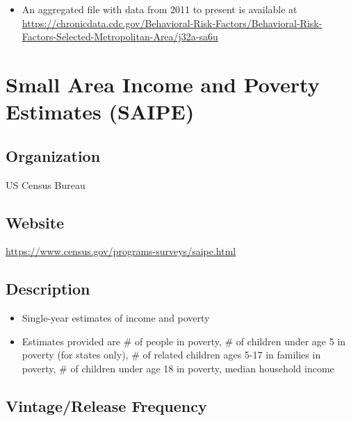 \documentclass[
]{book}
\providecommand{\tightlist}{%
  \setlength{\itemsep}{0pt}\setlength{\parskip}{0pt}}
\begin{document}
\begin{itemize}
\tightlist
\item
  An aggregated file with data from 2011 to present is available at \url{https://chronicdata.cdc.gov/Behavioral-Risk-Factors/Behavioral-Risk-Factors-Selected-Metropolitan-Area/j32a-sa6u}
\end{itemize}

\mainmatter

\hypertarget{small-area-income-and-poverty-estimates-saipe}{%
\chapter{Small Area Income and Poverty Estimates (SAIPE)}\label{small-area-income-and-poverty-estimates-saipe}}

\hypertarget{organization-79}{%
\section{Organization}\label{organization-79}}

US Census Bureau

\hypertarget{website-79}{%
\section{Website}\label{website-79}}

\url{https://www.census.gov/programs-surveys/saipe.html}

\hypertarget{description-79}{%
\section{Description}\label{description-79}}

\begin{itemize}
\tightlist
\item
  Single-year estimates of income and poverty
\item
  Estimates provided are \# of people in poverty, \# of children under age 5 in poverty (for states only), \# of related children ages 5-17 in families in poverty, \# of children under age 18 in poverty, median household income
\end{itemize}

\hypertarget{vintagerelease-frequency-79}{%
\section{Vintage/Release Frequency}\label{vintagerelease-frequency-79}}
\end{document}
